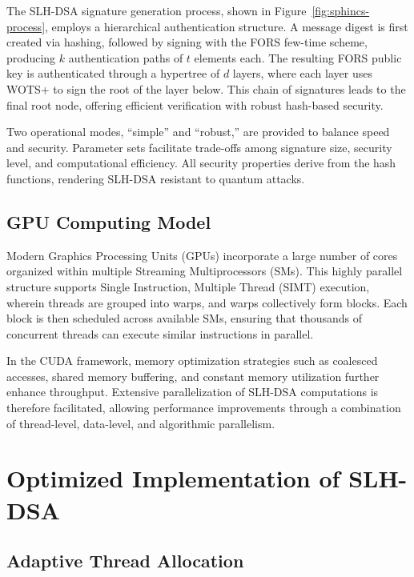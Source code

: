 \documentclass[journal]{IEEEtran}
\begin{document}
The SLH-DSA signature generation process, shown in Figure~\ref{fig:sphincs-process}, employs a hierarchical authentication structure. A message digest is first created via hashing, followed by signing with the FORS few-time scheme, producing $k$ authentication paths of $t$ elements each. The resulting FORS public key is authenticated through a hypertree of $d$ layers, where each layer uses WOTS+ to sign the root of the layer below. This chain of signatures leads to the final root node, offering efficient verification with robust hash-based security.

Two operational modes, “simple” and “robust,” are provided to balance speed and security. Parameter sets facilitate trade-offs among signature size, security level, and computational efficiency. All security properties derive from the hash functions, rendering SLH-DSA resistant to quantum attacks.

\subsection{GPU Computing Model}

Modern Graphics Processing Units (GPUs) incorporate a large number of cores organized within multiple Streaming Multiprocessors (SMs). This highly parallel structure supports Single Instruction, Multiple Thread (SIMT) execution, wherein threads are grouped into warps, and warps collectively form blocks. Each block is then scheduled across available SMs, ensuring that thousands of concurrent threads can execute similar instructions in parallel.

In the CUDA framework, memory optimization strategies such as coalesced accesses, shared memory buffering, and constant memory utilization further enhance throughput. Extensive parallelization of SLH-DSA computations is therefore facilitated, allowing performance improvements through a combination of thread-level, data-level, and algorithmic parallelism.

\section{Optimized Implementation of SLH-DSA}\label{sec:implementation}


\color{blue}

\subsection{Adaptive Thread Allocation}
\end{document}
